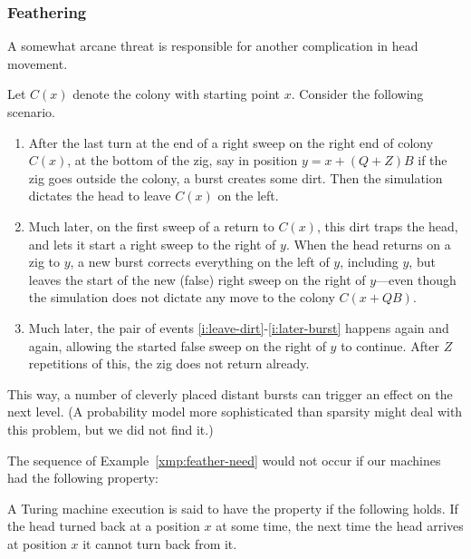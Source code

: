 \documentclass[12pt]{memoir}
\def\B{B}
\newcommand{\Q}{Q}
\newcommand{\Z}{Z}
\begin{document}
\subsubsection{Feathering}\label{sec:feathering}

A somewhat arcane
threat is responsible for another complication in head movement.

\begin{example}\label{xmp:feather-need}
Let \( C(x) \) denote the colony with starting point \( x \).
Consider the following scenario.

\begin{enumerate}
\item\label{i:leave-dirt}
After the last turn at the end of a right sweep on the right end of
colony \( C(x) \), at the bottom of the zig, say in
position \( y = x+(\Q+\Z)\B \) if the zig goes outside the colony, a burst creates some dirt.
Then the simulation dictates the head to leave \( C(x) \) on the left.

\item\label{i:later-burst} 
Much later, on the first sweep of a return to \( C(x) \), this dirt traps the head, and
lets it start a right sweep to the right of \( y \).  
When the head returns on a zig to \( y \), 
a new burst corrects everything on the left of \( y \), including \( y \), but leaves
the start of the new (false) right sweep on the right of \( y \)---even though
the simulation does not dictate any move to the colony \( C(x+\Q\B) \).

\item\label{i:repeat} Much later, the pair of events \ref{i:leave-dirt}-\ref{i:later-burst}
happens again and again, allowing the started false sweep on the right of \( y \) to continue.
After \( \Z \) repetitions of this, the zig does not return already.

\end{enumerate}
This way, a number of cleverly placed distant bursts can trigger an effect on the
next level.
(A probability model more sophisticated than sparsity might deal with this problem, but we did not find it.)
\end{example}

The sequence of Example~\ref{xmp:feather-need} would not occur if
our machines had the following property:

\begin{definition}[Feathering]\label{def:feathering}
A Turing machine execution is said to have the  property if the following holds.
If the head turned back at a position \( x \) at some time, 
the next time the head arrives at position \( x \) it cannot turn back from it.
\end{definition}
\end{document}
